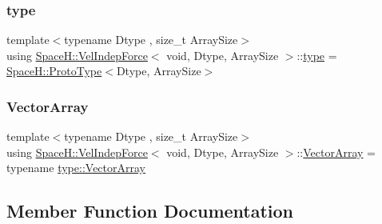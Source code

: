 \subsubsection{\texorpdfstring{type}{type}}
{\footnotesize\ttfamily template$<$typename Dtype , size\+\_\+t Array\+Size$>$ \\
using \mbox{\hyperlink{struct_space_h_1_1_vel_indep_force}{Space\+H\+::\+Vel\+Indep\+Force}}$<$ void, Dtype, Array\+Size $>$\+::\mbox{\hyperlink{struct_space_h_1_1_vel_indep_force_3_01void_00_01_dtype_00_01_array_size_01_4_af262039ce202a8b59d4a8dda2aa55e42}{type}} =  \mbox{\hyperlink{struct_space_h_1_1_proto_type}{Space\+H\+::\+Proto\+Type}}$<$Dtype, Array\+Size$>$}

\mbox{\label{struct_space_h_1_1_vel_indep_force_3_01void_00_01_dtype_00_01_array_size_01_4_ab547eb9c08979f28c5afafae93480702}} 
\subsubsection{\texorpdfstring{Vector\+Array}{VectorArray}}
{\footnotesize\ttfamily template$<$typename Dtype , size\+\_\+t Array\+Size$>$ \\
using \mbox{\hyperlink{struct_space_h_1_1_vel_indep_force}{Space\+H\+::\+Vel\+Indep\+Force}}$<$ void, Dtype, Array\+Size $>$\+::\mbox{\hyperlink{struct_space_h_1_1_vel_indep_force_3_01void_00_01_dtype_00_01_array_size_01_4_ab547eb9c08979f28c5afafae93480702}{Vector\+Array}} =  typename \mbox{\hyperlink{struct_space_h_1_1_proto_type_a622b8e122b33bb4966a02299fb7b82d6}{type\+::\+Vector\+Array}}}



\subsection{Member Function Documentation}
\mbox{\label{struct_space_h_1_1_vel_indep_force_3_01void_00_01_dtype_00_01_array_size_01_4_acab710a83235d9f068e5bebb97e14926}} 
